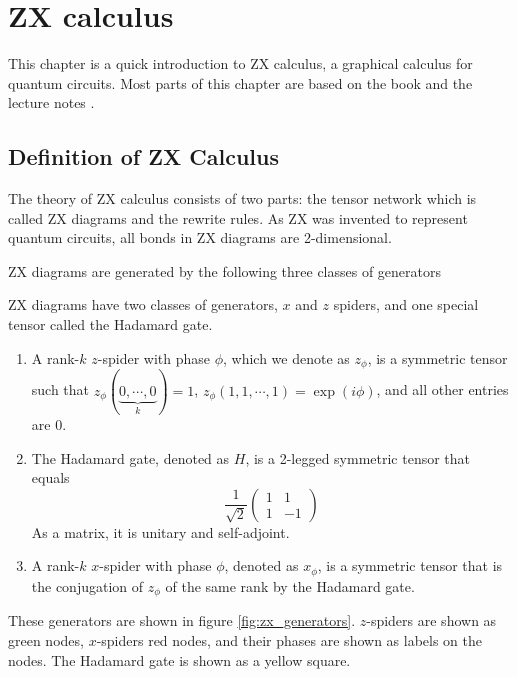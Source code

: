 \chapter{ZX calculus} \label{ch:zxw}

This chapter is a quick introduction to ZX calculus, a graphical calculus for quantum circuits.
Most parts of this chapter are based on the book \cite{KissingerWetering2024Book} and the lecture notes \cite{vandeweteringNotes}.

\section{Definition of ZX Calculus}

The theory of ZX calculus consists of two parts: the tensor network which is called ZX diagrams and the rewrite rules.
As ZX was invented to represent quantum circuits, all bonds in ZX diagrams are 2-dimensional.

ZX diagrams are generated by the following three classes of generators

\begin{definition}
ZX diagrams have two classes of generators, $x$ and $z$ spiders, and one special tensor called the Hadamard gate.
\begin{enumerate}
	\item A rank-$k$ $z$-spider with phase $\phi$, which we denote as $z_{\phi}$, is a symmetric tensor such that $z_{\phi}(\underbrace{0, \cdots, 0}_{k}) = 1$, $z_{\phi}(1, 1, \cdots, 1) = \exp(i \phi)$, and all other entries are $0$.
	\item The Hadamard gate, denoted as $H$, is a 2-legged symmetric tensor that equals 
		\begin{equation}
			\frac{1}{\sqrt{2}}\begin{pmatrix}
				1 & 1 \\ 1 & -1
			\end{pmatrix}
		\end{equation} \label{eq:hadamard}
		 As a matrix, it is unitary and self-adjoint.
	\item A rank-$k$ $x$-spider with phase $\phi$, denoted as $x_{\phi}$, is a symmetric tensor that is the conjugation of $z_{\phi}$ of the same rank by the Hadamard gate.
\end{enumerate}
\end{definition}

These generators are shown in figure \ref{fig:zx_generators}. 
$z$-spiders are shown as green nodes, $x$-spiders red nodes, and their phases are shown as labels on the nodes. 
The Hadamard gate is shown as a yellow square.

